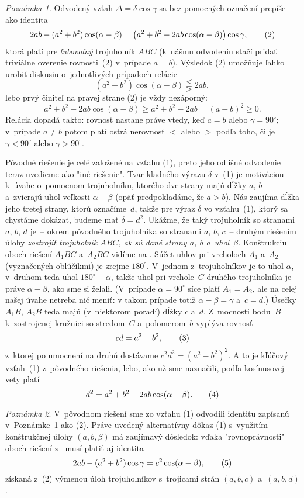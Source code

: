 {\smallskip
{\it Poznámka 1.} Odvodený vzťah $\Delta=\delta \cos\gamma$ sa bez
pomocných označení prepíše ako identita
$$
2ab-(a^2+b^2)\cos(\alpha-\beta)=
\bigl(a^2+b^2-2ab\cos(\alpha-\beta)\bigr)\cos\gamma,
\tag2
$$
ktorá platí pre {\it ľubovoľný\/} trojuholník $ABC$ (k~nášmu odvodeniu
stačí pridať triviálne overenie rovnosti~(2) v~prípade $a=b$).
Výsledok (2) umožňuje ľahko urobiť diskusiu o~jednotlivých
prípadoch relácie
$$
(a^2+b^2)\cos(\alpha-\beta)\lesseqqgtr 2ab,
$$
lebo prvý činiteľ na pravej strane (2) je vždy nezáporný:
$$
a^2+b^2-2ab\cos(\alpha-\beta)\ge a^2+b^2-2ab=(a-b)^2\ge0.
$$
Relácia dopadá takto: rovnosť nastane práve vtedy, keď $a=b$ alebo
$\gamma=90^\circ$; v~prípade $a\ne b$ potom platí ostrá nerovnosť
$<$ alebo $>$ podľa toho, či je $\gamma<90^\circ$ alebo $\gamma>90^\circ$.

\ineriesenie
Pôvodné riešenie je celé založené na vzťahu (1),
preto jeho odlišné odvodenie teraz uvedieme ako "iné riešenie".
Tvar kladného výrazu $\delta $ v~(1) je motiváciou k~úvahe o~pomocnom trojuholníku,
ktorého dve strany majú dĺžky $a$, $b$
a~zvierajú uhol veľkosti $\alpha-\beta$ (opäť predpokladáme, že $a>b$).
Nás zaujíma dĺžka jeho tretej strany, ktorú označíme~$d$, takže pre výraz $\delta $ vo
vzťahu~(1), ktorý sa chystáme dokázať, budeme mať $\delta =d^2$.
Ukážme, že taký trojuholník so stranami $a$, $b$, $d$ je~-- okrem pôvodného
trojuholníka so stranami $a$, $b$, $c$~--
druhým riešením úlohy {\it zostrojiť trojuholník $ABC$, ak sú dané
strany $a$, $b$ a~uhol~$\beta$}. Konštrukciu oboch riešení $A_1BC$
a~$A_2BC$ vidíme na \obr. Súčet uhlov pri vrcholoch $A_1$ a~$A_2$
(vyznačených oblúčikmi) je zrejme $180^\circ$.
V~jednom z~trojuholníkov je to uhol $\alpha$,
v~druhom teda uhol $180^\circ-\alpha$, takže uhol pri vrchole~$C$
druhého trojuholníka je práve $\alpha-\beta$, ako sme si želali. (V~prípade
$\alpha=90^\circ$ síce platí $A_1=A_2$, ale na celej našej úvahe
netreba nič meniť: v takom prípade totiž $\alpha-\beta=\gamma$ a~$c=d$.)
Úsečky $A_1B$, $A_2B$ teda majú (v~niektorom poradí) dĺžky
$c$ a~$d$. Z~mocnosti bodu~$B$ k~zostrojenej kružnici so stredom~$C$
a~polomerom~$b$ vyplýva rovnosť
$$
cd=a^2-b^2,     \tag3
$$
z~ktorej po umocnení na druhú dostávame $c^2d^2=(a^2-b^2)^2$.
A to je kľúčový vzťah~(1) z~pôvodného riešenia, lebo,
ako už sme naznačili, podľa kosínusovej vety platí
$$
d^2=a^2+b^2-2ab\cos(\alpha-\beta).   \tag4
$$
\inspicture{}


\medskip
{\it Poznámka 2}. V~pôvodnom riešení sme zo vzťahu (1)
odvodili identitu zapísanú v~Poznámke~1 ako (2).
Práve uvedený alternatívny dôkaz (1) s~využitím
konštrukčnej úlohy $(a,b,\beta)$ má zaujímavý dôsledok: vďaka
"rovnoprávnosti" oboch riešení z~ musí platiť aj identita
$$
2ab-(a^2+b^2)\cos\gamma=c^2\cos(\alpha-\beta),    \tag5
$$
získaná z~(2) výmenou úloh trojuholníkov s~trojicami strán $(a,b,c)$
a~$(a,b,d)$.

}
